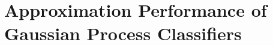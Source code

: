 \chapter{Approximation Performance of Gaussian Process Classifiers}
\label{Appendix:ApproximationPerformance}

